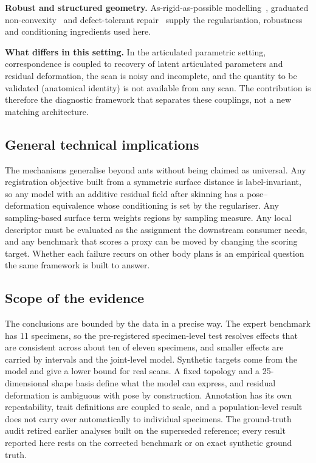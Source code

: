 \textbf{Robust and structured geometry.} As-rigid-as-possible
modelling~\cite{arap}, graduated non-convexity~\cite{gnc} and defect-tolerant
repair~\cite{alphawrap,manifoldplus} supply the regularisation, robustness and
conditioning ingredients used here.

\textbf{What differs in this setting.} In the articulated parametric setting,
correspondence is coupled to recovery of latent articulated parameters and residual
deformation, the scan is noisy and incomplete, and the quantity to be validated
(anatomical identity) is not available from any scan. The contribution is therefore
the diagnostic framework that separates these couplings, not a new matching
architecture.

\subsection{General technical implications}

The mechanisms generalise beyond ants without being claimed as universal. Any
registration objective built from a symmetric surface distance is label-invariant,
so any model with an additive residual field after skinning has a
pose--deformation equivalence whose conditioning is set by the regulariser. Any
sampling-based surface term weights regions by sampling measure. Any local
descriptor must be evaluated as the assignment the downstream consumer needs, and
any benchmark that scores a proxy can be moved by changing the scoring target.
Whether each failure recurs on other body plans is an empirical question the same
framework is built to answer.

\subsection{Scope of the evidence}

The conclusions are bounded by the data in a precise way. The expert benchmark has
11 specimens, so the pre-registered specimen-level test resolves effects that are
consistent across about ten of eleven specimens, and smaller effects are carried by
intervals and the joint-level model. Synthetic targets come from the model and give
a lower bound for real scans. A fixed topology and a 25-dimensional shape basis define
what the model can express, and residual deformation is ambiguous with pose by
construction. Annotation has its own repeatability, trait definitions are coupled to
scale, and a population-level result does not carry over automatically to individual
specimens. The ground-truth audit retired earlier analyses built on the superseded
reference; every result reported here rests on the corrected benchmark or on exact
synthetic ground truth.
